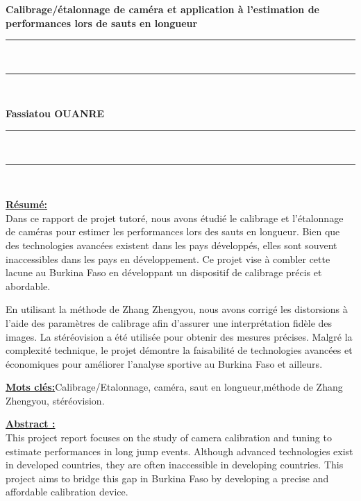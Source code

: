 \newpage
\thispagestyle{empty}
\begin{center}
  \renewcommand*{\familydefault}{\defaultFont}
  \fontsize{12pt}{12pt}\selectfont%
  \textbf{
  Calibrage/étalonnage de caméra et application à l’estimation de 
  performances lors de sauts en longueur\\%
  }
\vspace{15pt} {%
  \begin{spacing}{0.05}
    \rule{200pt}{2pt}\\
    \rule{200pt}{0.75pt}\\
  \end{spacing}
  \renewcommand*{\familydefault}{\defaultFont}
  \fontsize{14pt}{14pt}\selectfont%
  \vspace{15pt}
  \textbf{Fassiatou OUANRE}
  \vspace{8pt}
  \begin{spacing}{0.05}
    \rule{200pt}{0.75pt}\\
    \rule{200pt}{2pt}\\
  \end{spacing}
}
\end{center}

\fontsize{12pt}{12pt}\selectfont%
\underline{\textbf{Résumé:}}\\
 Dans ce rapport de projet tutoré, nous avons étudié le calibrage et l'étalonnage de caméras pour estimer les performances lors des sauts en longueur. Bien que des technologies avancées existent dans les pays développés, elles sont souvent inaccessibles dans les pays en développement. Ce projet vise à combler cette lacune au Burkina Faso en développant un dispositif de calibrage précis et abordable.
 
 En utilisant la méthode de Zhang Zhengyou, nous avons corrigé les distorsions à l'aide des paramètres de calibrage afin d'assurer une interprétation fidèle des images. La stéréovision a été utilisée pour obtenir des mesures précises. Malgré la complexité technique, le projet démontre la faisabilité de technologies avancées et économiques pour améliorer l'analyse sportive au Burkina Faso et ailleurs.\par
\begin{spacing}{1}
\underline{\textbf{Mots clés:}}Calibrage/Etalonnage, caméra, saut en longueur,méthode de Zhang Zhengyou, stéréovision.\\
\end{spacing}
\underline{\textbf{Abstract :}}\\
This project report focuses on the study of camera calibration and tuning to estimate performances in long jump events. Although advanced technologies exist in developed countries, they are often inaccessible in developing countries. This project aims to bridge this gap in Burkina Faso by developing a precise and affordable calibration device.

